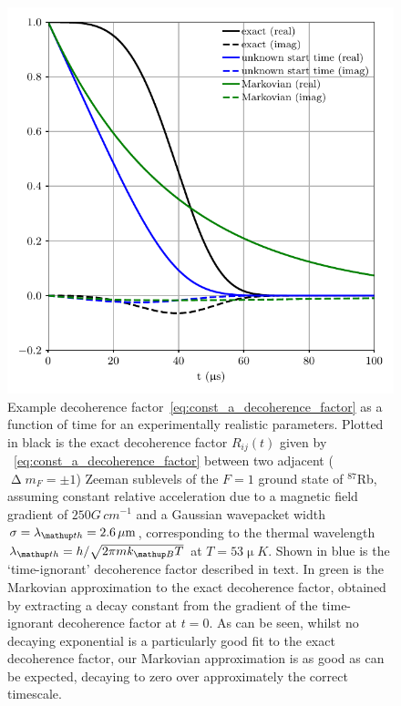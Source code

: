 \begin{figure}[t]
    \centerfloat
    \includegraphics{figures/hidden_variables/decoherence_factor_example.pdf}
    \caption{Example decoherence factor~\eqref{eq:const_a_decoherence_factor} as a function of time for an experimentally realistic parameters. Plotted in black is the exact decoherence factor $R_{ij}(t)$ given by ~\eqref{eq:const_a_decoherence_factor} between two adjacent ($\upDelta m_F = \pm 1$) Zeeman sublevels of the $F=1$ ground state of $^{87}$Rb, assuming constant relative acceleration due to a magnetic field gradient of $250\unit{G\,cm}^{-1}$ and a Gaussian wavepacket width $\sigma=\lambda_\up{th} = 2.6\unit{\mu m}$, corresponding to the thermal wavelength $\lambda_\up{th} = h/\sqrt{2\pi m k_\up{B} T}$ at $T=53\unit{\upmu K}$. Shown in blue is the `time-ignorant' decoherence factor described in text. In green is the Markovian approximation to the exact decoherence factor, obtained by extracting a decay constant from the gradient of the time-ignorant decoherence factor at $t=0$. As can be seen, whilst no decaying exponential is a particularly good fit to the exact decoherence factor, our Markovian approximation is as good as can be expected, decaying to zero over approximately the correct timescale.}
    \label{fig:decoherence_factor_example}
\end{figure}


